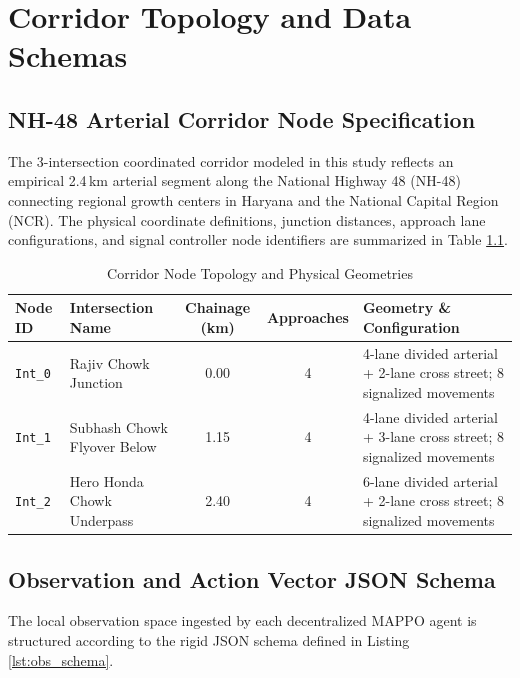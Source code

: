 \appendix
\chapter{Corridor Topology and Data Schemas}
\label{app:topology_schema}

\section{NH-48 Arterial Corridor Node Specification}
The 3-intersection coordinated corridor modeled in this study reflects an empirical 2.4\,km arterial segment along the National Highway 48 (NH-48) connecting regional growth centers in Haryana and the National Capital Region (NCR). The physical coordinate definitions, junction distances, approach lane configurations, and signal controller node identifiers are summarized in Table \ref{tab:corridor_spec_app}.

\begin{table}[htbp]
\centering
\small
\caption{Corridor Node Topology and Physical Geometries}
\label{tab:corridor_spec_app}
\begin{tabularx}{\textwidth}{|p{2.0cm}|p{3.2cm}|c|c|X|}
\hline
\textbf{Node ID} & \textbf{Intersection Name} & \textbf{Chainage (km)} & \textbf{Approaches} & \textbf{Geometry \& Configuration} \\ \hline
\texttt{Int\_0} & Rajiv Chowk Junction & 0.00 & 4 & 4-lane divided arterial + 2-lane cross street; 8 signalized movements \\ \hline
\texttt{Int\_1} & Subhash Chowk Flyover Below & 1.15 & 4 & 4-lane divided arterial + 3-lane cross street; 8 signalized movements \\ \hline
\texttt{Int\_2} & Hero Honda Chowk Underpass & 2.40 & 4 & 6-lane divided arterial + 2-lane cross street; 8 signalized movements \\ \hline
\end{tabularx}
\end{table}

\section{Observation and Action Vector JSON Schema}
The local observation space ingested by each decentralized MAPPO agent is structured according to the rigid JSON schema defined in Listing \ref{lst:obs_schema}.

